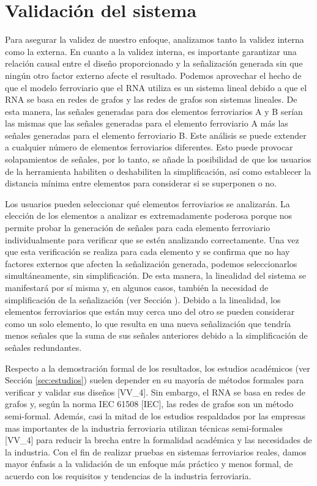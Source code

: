 \section{Validación del sistema}
    \label{sec:validacion}
    Para asegurar la validez de nuestro enfoque, analizamos tanto la validez interna como la externa. En cuanto a la validez interna, es importante garantizar una relación causal entre el diseño proporcionado y la señalización generada sin que ningún otro factor externo afecte el resultado. Podemos aprovechar el hecho de que el modelo ferroviario que el RNA utiliza es un sistema lineal debido a que el RNA se basa en redes de grafos y las redes de grafos son sistemas lineales. De esta manera, las señales generadas para dos elementos ferroviarios A y B serían las mismas que las señales generadas para el elemento ferroviario A más las señales generadas para el elemento ferroviario B. Este análisis se puede extender a cualquier número de elementos ferroviarios diferentes. Esto puede provocar solapamientos de señales, por lo tanto, se añade la posibilidad de que los usuarios de la herramienta habiliten o deshabiliten la simplificación, así como establecer la distancia mínima entre elementos para considerar si se superponen o no.

    Los usuarios pueden seleccionar qué elementos ferroviarios se analizarán. La elección de los elementos a analizar es extremadamente poderosa porque nos permite probar la generación de señales para cada elemento ferroviario individualmente para verificar que se estén analizando correctamente. Una vez que esta verificación se realiza para cada elemento y se confirma que no hay factores externos que afecten la señalización generada, podemos seleccionarlos simultáneamente, sin simplificación. De esta manera, la linealidad del sistema se manifestará por sí misma y, en algunos casos, también la necesidad de simplificación de la señalización (ver Sección \label{sec:simplificacion}). Debido a la linealidad, los elementos ferroviarios que están muy cerca uno del otro se pueden considerar como un solo elemento, lo que resulta en una nueva señalización que tendría menos señales que la suma de sus señales anteriores debido a la simplificación de señales redundantes.

    Respecto a la demostración formal de los resultados, los estudios académicos (ver Sección \ref{sec:estudios}) suelen depender en su mayoría de métodos formales para verificar y validar sus diseños [VV\_4]. Sin embargo, el RNA se basa en redes de grafos y, según la norma IEC 61508 [IEC], las redes de grafos son un método semi-formal. Además, casi la mitad de los estudios respaldados por las empresas mas importantes de la industria ferroviaria utilizan técnicas semi-formales [VV\_4] para reducir la brecha entre la formalidad académica y las necesidades de la industria. Con el fin de realizar pruebas en sistemas ferroviarios reales, damos mayor énfasis a la validación de un enfoque más práctico y menos formal, de acuerdo con los requisitos y tendencias de la industria ferroviaria.
    
